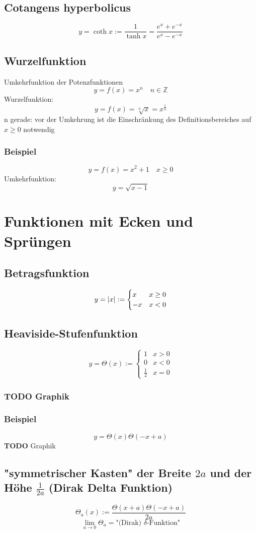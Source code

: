 \documentclass[a4paper]{scrartcl}
\DeclarePairedDelimiter\abs{\lvert}{\rvert}%
\begin{document}
\subsection{Cotangens hyperbolicus}
\label{sec-5-12}
\[y=\coth{x}:=\frac{1}{\tanh{x}}=\frac{e^x + e^{-x}}{e^x - e^{-x}}\]
\subsection{Wurzelfunktion}
\label{sec-5-13}
Umkehrfunktion der Potenzfunktionen \[y=f(x)=x^n\quad n\in\mathbb{Z}\]
Wurzelfunktion: \[y=f(x)=\sqrt[n]{x} = x^\frac{1}{n}\]
n gerade: vor der Umkehrung ist die Einschränkung des Definitionsbereiches auf $x\geq 0$ notwendig
\subsubsection{Beispiel}
\label{sec-5-13-1}
\[y=f(x)=x^2 + 1\quad x\geq 0\]
Umkehrfunktion: \[y=\sqrt{x-1}\]
\section{Funktionen mit Ecken und Sprüngen}
\label{sec-6}
\subsection{Betragsfunktion}
\label{sec-6-1}
\[y=\abs{x}:=\begin{cases}x& x \geq 0\\ -x& x < 0\end{cases}\]
\subsection{Heaviside-Stufenfunktion}
\label{sec-6-2}
\[y=\Theta(x):=\begin{cases}1&x>0\\0&x<0\\\frac{1}{2}&x=0\end{cases}\]
\subsubsection{{\bfseries\sffamily TODO} Graphik}
\label{sec-6-2-1}
\subsubsection{Beispiel}
\label{sec-6-2-2}
\[y=\Theta(x)\Theta(-x+a)\]
\textbf{TODO} Graphik
\subsection{"symmetrischer Kasten" der Breite $2a$ und der Höhe $\frac{1}{2a}$ (Dirak Delta Funktion)}
\label{sec-6-3}
\[\Theta_a (x):=\frac{\Theta(x+a)\Theta(-x+a)}{2a}\]
\[\lim_{a\to 0}\Theta_a=\text{"(Dirak) $\delta$-Funktion"}\]
\end{document}
